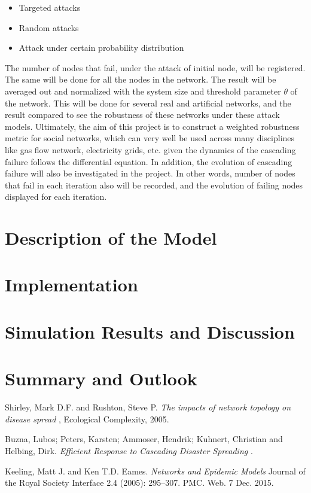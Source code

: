 \documentclass[11pt]{article}
\begin{document}
\begin{itemize}
\item Targeted attacks
\item Random attacks
\item Attack under certain probability distribution
\end{itemize}

 The number of nodes that fail, under the attack of initial node, will be registered. The same will be done for all the nodes in the network. The result will be averaged out and normalized with the system size and threshold parameter $\theta$ of the network. This will be done for several real and artificial networks, and the result compared to see the robustness of these networks under these attack models. Ultimately, the aim of this project is to construct a weighted robustness metric for social networks, which can very well be used across many disciplines like gas flow network, electricity grids, etc. given the dynamics of the cascading failure follows the differential equation. In addition, the evolution of cascading failure will also be investigated in the project. In other words, number of nodes that fail in each iteration also will be recorded, and the evolution of failing nodes displayed for each iteration.

\section{Description of the Model}

\section{Implementation}

\section{Simulation Results and Discussion}

\section{Summary and Outlook}

\begin{thebibliography}{9}
 Shirley, Mark D.F. and Rushton, Steve P. \textit{ The impacts of network topology on disease spread }, Ecological Complexity, 2005.

 Buzna, Lubos; Peters, Karsten; Ammoser, Hendrik;  Kuhnert, Christian and Helbing, Dirk.\textit{ Efficient Response to Cascading Disaster Spreading } .

Keeling, Matt J. and Ken T.D. Eames. \textit{ Networks and Epidemic Models } Journal of the Royal Society Interface 2.4 (2005): 295–307. PMC. Web. 7 Dec. 2015.

\end{thebibliography}
\end{document}
